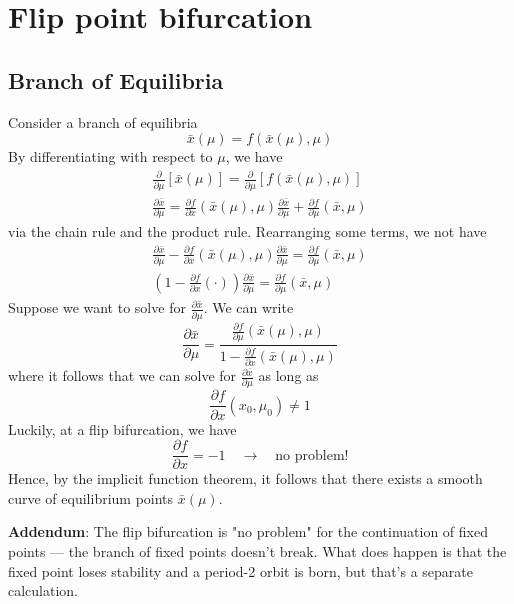 \documentclass{article}
\begin{document}
\section{Flip point bifurcation}

\subsection{Branch of Equilibria}

Consider a branch of equilibria 
\[
\bar{x}(\mu) = f\left( \bar{x}(\mu), \mu \right)
\] 
By differentiating with respect to $\mu$, we have
\begin{gather*}
    \frac{\partial}{\partial \mu}\left[\bar{x}(\mu)\right] = \frac{\partial}{\partial \mu}\left[f\left( \bar{x}(\mu), \mu \right)\right]\\
    \frac{\partial \bar{x}}{\partial \mu} = \frac{\partial f}{\partial x}(\bar{x}(\mu), \mu)\frac{\partial \bar{x}}{\partial \mu} + \frac{\partial f}{\partial \mu}(\bar{x}, \mu)
\end{gather*}
via the chain rule and the product rule. Rearranging some terms, we not have 
\begin{gather*}
    \frac{\partial \bar{x}}{\partial \mu} - \frac{\partial f}{\partial x}(\bar{x}(\mu), \mu)\frac{\partial \bar{x}}{\partial \mu} = \frac{\partial f}{\partial \mu}(\bar{x}, \mu)\\
    \left(1 - \frac{\partial f}{\partial x}(\cdot)\right)\frac{\partial \bar{x}}{\partial \mu} = \frac{\partial f}{\partial \mu}(\bar{x}, \mu)
\end{gather*}
Suppose we want to solve for $\frac{\partial \bar{x}}{\partial \mu}$. We can write 
\[
\frac{\partial \bar{x}}{\partial \mu} = \frac{\frac{\partial f}{\partial \mu}(\bar{x}(\mu), \mu)}{1 - \frac{\partial f}{\partial x}(\bar{x}(\mu), \mu)}
\]
where it follows that we can solve for $\frac{\partial \bar{x}}{\partial \mu}$ as long as 
\[
\frac{\partial f}{\partial x}(x_0, \mu_0) \neq 1
\]
Luckily, at a flip bifurcation, we have 
\[
\frac{\partial f}{\partial x} = -1 \quad \longrightarrow \quad \text{no problem!}
\]
Hence, by the implicit function theorem, it follows that there exists a smooth curve of equilibrium points $\bar{x}(\mu)$.
\begin{mdframed}
    \textbf{Addendum}: The flip bifurcation is "no problem" for the continuation of fixed points — the branch of fixed points doesn't break. What does happen is that the fixed point loses stability and a period-2 orbit is born, but that's a separate calculation.
\end{mdframed}
\end{document}
